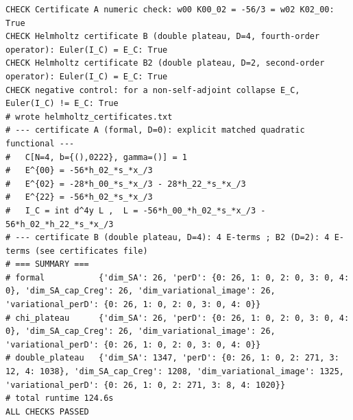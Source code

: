 \documentclass{article}
\theoremstyle{remark}
\begin{document}
\begin{lstlisting}
CHECK Certificate A numeric check: w00 K00_02 = -56/3 = w02 K02_00: True
CHECK Helmholtz certificate B (double plateau, D=4, fourth-order operator): Euler(I_C) = E_C: True
CHECK Helmholtz certificate B2 (double plateau, D=2, second-order operator): Euler(I_C) = E_C: True
CHECK negative control: for a non-self-adjoint collapse E_C, Euler(I_C) != E_C: True
# wrote helmholtz_certificates.txt
# --- certificate A (formal, D=0): explicit matched quadratic functional ---
#   C[N=4, b={(),0222}, gamma=()] = 1
#   E^{00} = -56*h_02_*s_*x_/3
#   E^{02} = -28*h_00_*s_*x_/3 - 28*h_22_*s_*x_/3
#   E^{22} = -56*h_02_*s_*x_/3
#   I_C = int d^4y L ,  L = -56*h_00_*h_02_*s_*x_/3 - 56*h_02_*h_22_*s_*x_/3
# --- certificate B (double plateau, D=4): 4 E-terms ; B2 (D=2): 4 E-terms (see certificates file)
# === SUMMARY ===
# formal           {'dim_SA': 26, 'perD': {0: 26, 1: 0, 2: 0, 3: 0, 4: 0}, 'dim_SA_cap_Creg': 26, 'dim_variational_image': 26, 'variational_perD': {0: 26, 1: 0, 2: 0, 3: 0, 4: 0}}
# chi_plateau      {'dim_SA': 26, 'perD': {0: 26, 1: 0, 2: 0, 3: 0, 4: 0}, 'dim_SA_cap_Creg': 26, 'dim_variational_image': 26, 'variational_perD': {0: 26, 1: 0, 2: 0, 3: 0, 4: 0}}
# double_plateau   {'dim_SA': 1347, 'perD': {0: 26, 1: 0, 2: 271, 3: 12, 4: 1038}, 'dim_SA_cap_Creg': 1208, 'dim_variational_image': 1325, 'variational_perD': {0: 26, 1: 0, 2: 271, 3: 8, 4: 1020}}
# total runtime 124.6s
ALL CHECKS PASSED
\end{lstlisting}
\end{document}
